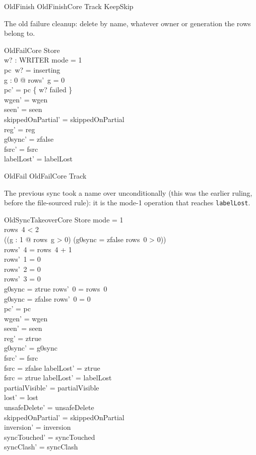 \documentclass[a4paper,10pt,fleqn]{article}
\newcommand{\field}[1]{\texttt{#1}}
\begin{document}
\begin{zed}
OldFinish  OldFinishCore \land Track \land KeepSkip
\end{zed}

The old failure cleanup: delete by name, whatever owner or generation the
rows belong to.

\begin{schema}{OldFailCore}
\Delta Store \\ w? : WRITER
\where
mode = 1 \\
pc~w? = inserting \\
\forall g : 0  @ rows'~g = 0 \\
pc' = pc \oplus \{ w? \mapsto failed \} \\
wgen' = wgen \\
seen' = seen \\
skippedOnPartial' = skippedOnPartial \\
reg' = reg \\
g0sync' = zfalse \\
fsrc' = fsrc \\
labelLost' = labelLost
\end{schema}

\begin{zed}
OldFail  OldFailCore \land Track
\end{zed}

The previous sync took a name over unconditionally (this was the earlier
ruling, before the file-sourced rule): it is the mode-1 operation that reaches
\field{labelLost}.

\begin{schema}{OldSyncTakeoverCore}
\Delta Store
\where
mode = 1 \\
rows~4 < 2 \\
((\exists g : 1  @ rows~g > 0) \lor
  (g0sync = zfalse \land rows~0 > 0)) \\
rows'~4 = rows~4 + 1 \\
rows'~1 = 0 \\
rows'~2 = 0 \\
rows'~3 = 0 \\
g0sync = ztrue \implies rows'~0 = rows~0 \\
g0sync = zfalse \implies rows'~0 = 0 \\
pc' = pc \\
wgen' = wgen \\
seen' = seen \\
reg' = ztrue \\
g0sync' = g0sync \\
fsrc' = fsrc \\
fsrc = zfalse \implies labelLost' = ztrue \\
fsrc = ztrue \implies labelLost' = labelLost \\
partialVisible' = partialVisible \\
lost' = lost \\
unsafeDelete' = unsafeDelete \\
skippedOnPartial' = skippedOnPartial \\
inversion' = inversion \\
syncTouched' = syncTouched \\
syncClash' = syncClash
\end{schema}
\end{document}
